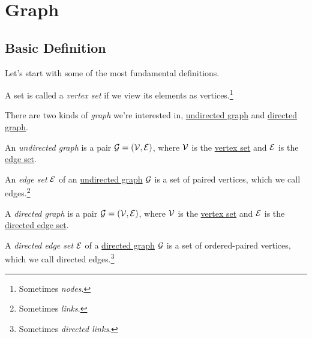 \chapter{Graph}
\section{Basic Definition}
Let's start with some of the most fundamental definitions.

\begin{definition}\label{def:vertex-set}
	A set is called a \emph{vertex set} if we view its elements as vertices.\footnote{Sometimes \emph{nodes}.}
\end{definition}

\begin{definition}[Graph]\label{def:graph}
	There are two kinds of \emph{graph} we're interested in, \hyperref[def:undirected-graph]{undirected graph} and \hyperref[def:directed-graph]{directed graph}.
	\begin{definition}\label{def:undirected-graph}
		An \emph{undirected graph} is a pair \(\mathcal{G} = (\mathcal{\MakeUppercase{v}} , \mathcal{\MakeUppercase{e}} )\), where \(\mathcal{\MakeUppercase{v}} \) is
		the \hyperref[def:vertex-set]{vertex set} and \(\mathcal{\MakeUppercase{e}} \) is the \hyperref[def:edge-set]{edge set}.

		\begin{definition}\label{def:edge-set}
			An \emph{edge set} \(\mathcal{\MakeUppercase{e}} \) of an \hyperref[def:undirected-graph]{undirected graph} \(\mathcal{\MakeUppercase{g}} \) is a set of paired vertices, which we call edges.\footnote{Sometimes \emph{links}.}
		\end{definition}
	\end{definition}

	\begin{definition}\label{def:directed-graph}
		A \emph{directed graph} is a pair \(\mathcal{\MakeUppercase{g}} = (\mathcal{\MakeUppercase{v}}, \mathcal{\MakeUppercase{e}} )\), where \(\mathcal{\MakeUppercase{v}} \)
		is the \hyperref[def:vertex-set]{vertex set} and \(\mathcal{\MakeUppercase{e}} \) is the \hyperref[def:directed-edge-set]{directed edge set}.

		\begin{definition}\label{def:directed-edge-set}
			A \emph{directed edge set} \(\mathcal{\MakeUppercase{e}} \) of a \hyperref[def:directed-graph]{directed graph} \(\mathcal{\MakeUppercase{g}} \) is a set of ordered-paired vertices, which we call directed edges.\footnote{Sometimes \emph{directed links}.}
		\end{definition}
	\end{definition}
\end{definition}

